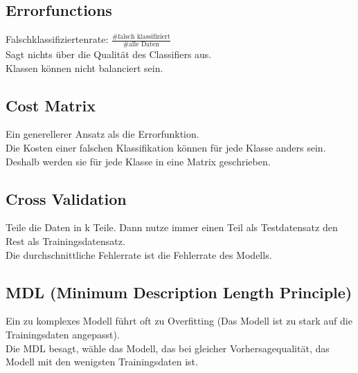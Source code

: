 \documentclass[a4paper]{scrartcl}
\begin{document}
\subsection{Errorfunctions}
Falschklassifiziertenrate: $\frac{\#\mbox{falsch klassifiziert}}{\#\mbox{alle Daten}}$\\
Sagt nichts über die Qualität des Classifiers aus.\\
Klassen können nicht balanciert sein.

\subsection{Cost Matrix}
Ein generellerer Ansatz als die Errorfunktion.\\
Die Kosten einer falschen Klassifikation können für jede Klasse anders sein.\\
Deshalb werden sie für jede Klasse in eine Matrix geschrieben.

\subsection{Cross Validation}
Teile die Daten in k Teile. Dann nutze immer einen Teil als Testdatensatz den Rest als Trainingsdatensatz.\\
Die durchschnittliche Fehlerrate ist die Fehlerrate des Modells.

\subsection{MDL (Minimum Description Length Principle)}
Ein zu komplexes Modell führt oft zu Overfitting (Das Modell ist zu stark auf die Trainingsdaten angepasst).\\ 
Die MDL besagt, wähle das Modell, das bei gleicher Vorhersagequalität, das Modell mit den wenigsten Trainingsdaten ist.
\end{document}
